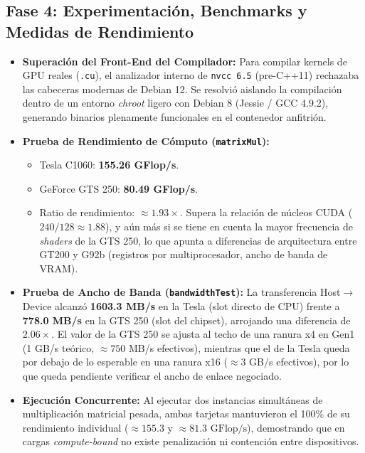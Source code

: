 \documentclass[a4paper,11pt]{article}
\begin{document}
\subsection*{Fase 4: Experimentación, Benchmarks y Medidas de Rendimiento}
\begin{itemize}[leftmargin=*,itemsep=2pt]
    \item \textbf{Superación del Front-End del Compilador:} Para compilar kernels de GPU reales (\texttt{.cu}), el analizador interno de \texttt{nvcc 6.5} (pre-C++11) rechazaba las cabeceras modernas de Debian 12. Se resolvió aislando la compilación dentro de un entorno \textit{chroot} ligero con Debian 8 (Jessie / GCC 4.9.2), generando binarios plenamente funcionales en el contenedor anfitrión.
    \item \textbf{Prueba de Rendimiento de Cómputo (\texttt{matrixMul}):}
    \begin{itemize}[label=$\circ$,itemsep=1pt]
        \item Tesla C1060: \textbf{155.26 GFlop/s}.
        \item GeForce GTS 250: \textbf{80.49 GFlop/s}.
        \item Ratio de rendimiento: $\approx 1.93\times$. Supera la relación de núcleos CUDA ($240/128 \approx 1.88$), y aún más si se tiene en cuenta la mayor frecuencia de \textit{shaders} de la GTS 250, lo que apunta a diferencias de arquitectura entre GT200 y G92b (registros por multiprocesador, ancho de banda de VRAM).
    \end{itemize}
    \item \textbf{Prueba de Ancho de Banda (\texttt{bandwidthTest}):} La transferencia Host$\to$Device alcanzó \textbf{1603.3 MB/s} en la Tesla (slot directo de CPU) frente a \textbf{778.0 MB/s} en la GTS 250 (slot del chipset), arrojando una diferencia de $\mathbf{2.06\times}$. El valor de la GTS 250 se ajusta al techo de una ranura x4 en Gen1 (1 GB/s teórico, $\approx 750$ MB/s efectivos), mientras que el de la Tesla queda por debajo de lo esperable en una ranura x16 ($\approx 3$ GB/s efectivos), por lo que queda pendiente verificar el ancho de enlace negociado.
    \item \textbf{Ejecución Concurrente:} Al ejecutar dos instancias simultáneas de multiplicación matricial pesada, ambas tarjetas mantuvieron el 100\% de su rendimiento individual ($\approx 155.3$ y $\approx 81.3\text{ GFlop/s}$), demostrando que en cargas \textit{compute-bound} no existe penalización ni contención entre dispositivos.
\end{itemize}
\end{document}
